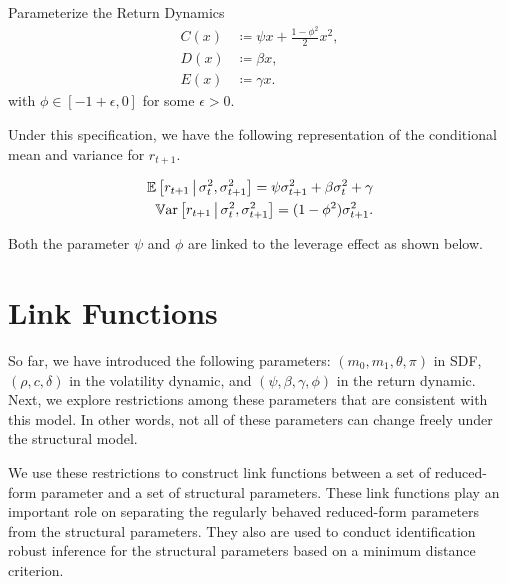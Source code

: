 \documentclass[11pt, letterpaper, twoside]{article}
\begin{document}
\begin{defn}{Parameterize the Return Dynamics}
    \label{defn:physical_return_dynamics}
    \begin{align}
        C(x) &\coloneqq \psi x + \frac{1 - \phi^2}{2} x^2,\\
        D(x) &\coloneqq \beta x, \\
        E(x) &\coloneqq \gamma x.
    \end{align}
with $\phi \in [-1+\epsilon, 0]$ for some $\epsilon>0$.
\end{defn}



Under this specification, we have the following representation of the conditional mean and variance for $r_{t+1}$.

\begin{remark} 
	\label{remark:return_moment_conditions}
	\begin{align}
		\label{eqn:rtn_cond_mean}
		\operatorname{\mathbb{E}}\left[r_{t+1} \,\middle\vert\, \sigma^2_t, \sigma^2_{t+1}\right] = \psi \sigma^2_{t+1} + \beta \sigma^2_t + \gamma \\
		\label{eqn:rtn_cond_vol}
		\operatorname{\mathbb{V}ar}\left[r_{t+1} \,\middle\vert\, \sigma^2_t, \sigma^2_{t+1}\right] = (1 - \phi^2) \sigma^2_{t+1}.
	\end{align}
\end{remark}


Both the parameter $\psi$ and $\phi$ are linked to the leverage effect as shown below.

\section{Link Functions}

So far, we have introduced the following parameters: $(m_{0},m_{1},\theta
,\pi )$ in SDF, $(\rho ,c,\delta )$ in the volatility dynamic, and $(\psi
,\beta ,\gamma ,\phi )$ in the return dynamic. Next, we explore restrictions
among these parameters that are consistent with this model. In other words,
not all of these parameters can change freely under the structural model.

We use these restrictions to construct link functions between a set of
reduced-form parameter and a set of structural parameters. These link
functions play an important role on separating the regularly behaved
reduced-form parameters from the structural parameters. They also are used
to conduct identification robust inference for the structural parameters
based on a minimum distance criterion.
\end{document}
